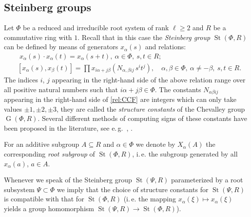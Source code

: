\documentclass[oneside, 8pt]{amsart}
\theoremstyle{remark}
\theoremstyle{definition}
\numberwithin{lemma}{section}
\numberwithin{prop}{section}
\numberwithin{corollary}{section}
\numberwithin{externaltheorem}{section}
\DeclareMathOperator{\St}{St}
\DeclareMathOperator{\GG}{G}
\numberwithin{equation}{section}
\begin{document}
\subsection{Steinberg groups} \label{sec:Steinberg-intro}
Let $\Phi$ be a reduced and irreducible root system of rank $\ell \geq 2$ and $R$ be a commutative ring with $1$. Recall that in this case the \emph{Steinberg group} $\St(\Phi, R)$ can be defined by means of generators $x_{\alpha}(s)$ and relations:
\begin{align}
& \phantom{[}
x_\alpha(s) \cdot x_\alpha(t) = x_\alpha(s+t),\ \alpha\in\Phi,\ s,t\in R; \label{rel:add}\\
& [x_\alpha(s), x_\beta(t)] = \prod
 x_{i\alpha + j\beta}\left(N_{\alpha,\beta ij}\, s^i t^j\right),\quad \alpha,\beta\in\Phi,\ \alpha\neq-\beta,\ s,t\in R. \label{rel:CCF}
\end{align}
The indices $i$, $j$ appearing in the right-hand side of the above relation range over
all positive natural numbers such that $i\alpha + j\beta\in\Phi$.
The constants $N_{\alpha \beta i j}$ appearing in the right-hand side of \eqref{rel:CCF} are integers which can only take values $\pm 1,\pm 2,\pm 3$, they are called the {\it structure constants} of the Chevalley group $\GG(\Phi, R)$. Several different methods of computing signs of these constants have been proposed in the literature, see e.\,g.~\cite{V00}, \cite[\S~9]{VP}. 

For an additive subgroup $A\subseteq R$ and $\alpha \in \Phi$ we denote by $X_\alpha(A)$ the corresponding {\it root subgroup} of $\St(\Phi, R)$, i.\,e. the subgroup generated by all $x_\alpha(a)$, $a \in A$.

Whenever we speak of the Steinberg group $\St(\Psi, R)$ parameterized by a root subsystem $\Psi \subset \Phi$ we imply that the choice of structure constants 
 for $\St(\Psi, R)$ is compatible with that for $\St(\Phi, R)$ (i.\,e. the mapping $x_\alpha(\xi) \mapsto x_\alpha(\xi)$ yields a group homomorphism $\St(\Psi, R) \to \St(\Phi, R)$).
\end{document}
